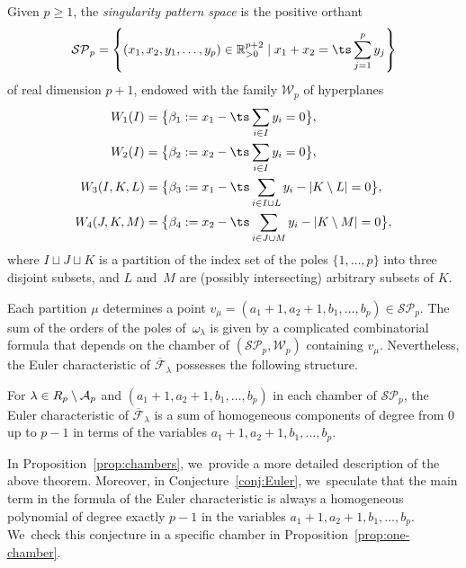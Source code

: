 \begin{defn}\label{defn:SPS}
Given $p \geq 1$, the \textit{singularity pattern space} is the positive orthant
\[
\mathcal{SP}_{p}=\left\{ (x_{1},x_{2},y_{1},\dots,y_{p}) \in \mathbb{R}_{>0}^{p+2} \mid x_{1}+x_{2}= \ts\sum_{j=1}^p y_{j} \right\}
\]
of real dimension $p+1$, endowed with the family $\mathcal{W}_{p}$ of hyperplanes
\begin{align}\label{eq:hyptype1}
&\hspace*{-.95cm}\begin{aligned}
W_{1}(I)&=\bigl\{\beta_{1}:=x_{1} - \ts\sum_{i \in I} y_{i} = 0\bigr\},\\
W_{2}(I)&=\bigl\{\beta_{2}:=x_{2} - \ts\sum_{i \in I} y_{i} = 0\bigr\},
\end{aligned}\\
\label{eq:hyptype2}
W_{3}(I,K,L)&=\bigl\{\beta_{3}:=x_{1} - \ts\sum_{i \in I \cup L} y_{i} -|K \setminus L| = 0\bigr\},\\
\label{eq:hyptype3}
W_{4}(J,K,M)&=\bigl\{\beta_{4}:=x_{2} - \ts\sum_{i \in J \cup M} y_{i} -|K \setminus M| = 0\bigr\},
\end{align}
where $I \sqcup J \sqcup K$ is a partition of the index set of the poles $\lbrace{1,\dots,p \rbrace}$ into three disjoint subsets, and $L$ and~$M$ are (possibly intersecting) arbitrary subsets of $K$.
\end{defn}

Each partition $\mu$ determines a point $v_{\mu}=(a_{1}+1,a_{2}+1,b_{1},\dots,b_{p})\in \mathcal{SP}_{p}$. The sum of the orders of the poles of~$\omega_{\lambda}$ is given by a complicated combinatorial formula that depends on the chamber of $(\mathcal{SP}_{p},\mathcal{W}_{p})$ containing $v_{\mu}$. Nevertheless, the Euler characteristic of $\overline{\mathcal F}_\lambda$ possesses the following structure.

\begin{thm}\label{thm:chambers}
For $\lambda \in \mathcal \mathcal{R}_{p} \setminus \mathcal{A}_{p}$ and $(a_1+1, a_2+1, b_1, \ldots, b_p)$ in each chamber of $\mathcal{SP}_p$, the Euler characteristic of $\overline{\mathcal F}_\lambda$ is a sum of homogeneous components of degree from $0$ up to $p-1$ in terms of the variables $a_{1}+1,a_{2}+1,b_{1},\dots,b_{p}$.
\end{thm}
In Proposition~\ref{prop:chambers}, we~provide a more detailed description of the above theorem. Moreover, in Conjecture~\ref{conj:Euler}, we~speculate that the main term in the formula of the Euler characteristic is always a homogeneous polynomial of degree exactly $p-1$ in the variables $a_{1}+1,a_{2}+1,b_{1},\dots,b_{p}$. We~check this conjecture in a specific chamber in Proposition~\ref{prop:one-chamber}.

